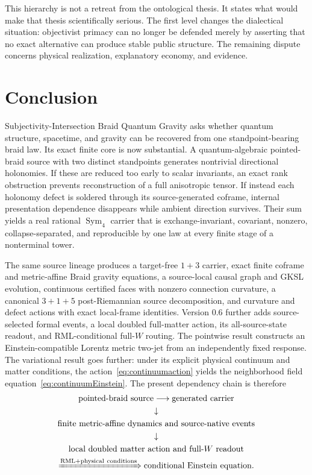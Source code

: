 \documentclass[11pt]{article}
\theoremstyle{definition}
\theoremstyle{remark}
\newcommand{\Sym}{\operatorname{Sym}}
\begin{document}
This hierarchy is not a retreat from the ontological thesis. It states what would make that thesis scientifically serious. The first level changes the dialectical situation: objectivist primacy can no longer be defended merely by asserting that no exact alternative can produce stable public structure. The remaining dispute concerns physical realization, explanatory economy, and evidence.

\section{Conclusion}

Subjectivity-Intersection Braid Quantum Gravity asks whether quantum structure, spacetime, and gravity can be recovered from one standpoint-bearing braid law. Its exact finite core is now substantial. A quantum-algebraic pointed-braid source with two distinct standpoints generates nontrivial directional holonomies. If these are reduced too early to scalar invariants, an exact rank obstruction prevents reconstruction of a full anisotropic tensor. If instead each holonomy defect is soldered through its source-generated coframe, internal presentation dependence disappears while ambient direction survives. Their sum yields a real rational $\Sym_4$ carrier that is exchange-invariant, covariant, nonzero, collapse-separated, and reproducible by one law at every finite stage of a nonterminal tower.

The same source lineage produces a target-free $1+3$ carrier, exact finite coframe and metric-affine Braid gravity equations, a source-local causal graph and GKSL evolution, continuous certified faces with nonzero connection curvature, a canonical $3+1+5$ post-Riemannian source decomposition, and curvature and defect actions with exact local-frame identities. Version 0.6 further adds source-selected formal events, a local doubled full-matter action, its all-source-state readout, and RML-conditional full-$W$ routing. The pointwise result constructs an Einstein-compatible Lorentz metric two-jet from an independently fixed response. The variational result goes further: under its explicit physical continuum and matter conditions, the action~\eqref{eq:continuumaction} yields the neighborhood field equation~\eqref{eq:continuumEinstein}. The present dependency chain is therefore
\[
 \begin{gathered}
 \text{pointed-braid source}\longrightarrow\text{generated carrier}\\
 \downarrow\\
 \text{finite metric-affine dynamics and source-native events}\\
 \downarrow\\
 \text{local doubled matter action and full-}W\text{ readout}\\
 \xRightarrow{\mathrm{RML+physical\ conditions}}\text{conditional Einstein equation}.
 \end{gathered}
\]
\end{document}
